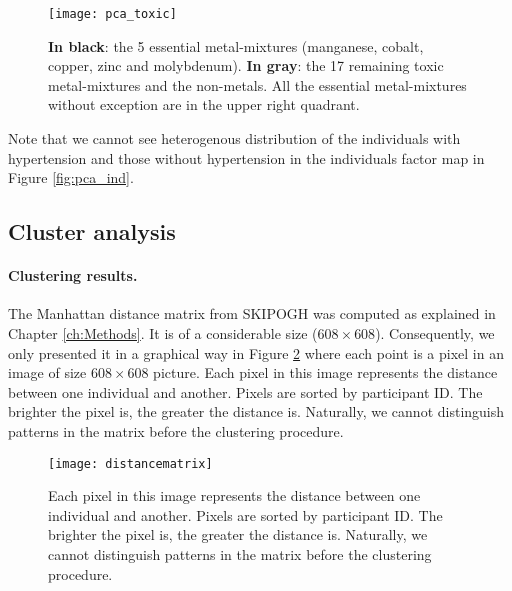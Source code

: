 \begin{figure}
\centering
\captionsetup{singlelinecheck = false, format= hang, justification=raggedright, font=small, labelsep=space}
\texttt{[image: pca\_toxic]}
  \label{fig:pca_toxic}
\begin{flushleft}
{\footnotesize \textbf{In black}: the 5 essential metal-mixtures (manganese, cobalt, copper, zinc and molybdenum). \textbf{In gray}: the 17 remaining toxic metal-mixtures and the non-metals. All the essential metal-mixtures without exception are in the upper right quadrant.}
\end{flushleft}
\end{figure}

Note that we cannot see heterogenous distribution of the individuals with hypertension and those without hypertension in the individuals factor map in Figure \ref{fig:pca_ind}.

\subsection{Cluster analysis}

\paragraph{Clustering results.}
The Manhattan distance matrix from SKIPOGH was computed as explained in Chapter \ref{ch:Methods}. It is of a considerable size ($608 \times 608$). Consequently, we only presented it in a graphical way in Figure \ref{fig:distancematrix} where each point is a pixel in an image of size $608 \times 608$ picture. Each pixel in this image represents the distance between one individual and another. Pixels are sorted by participant ID. The brighter the pixel is, the greater the distance is. Naturally, we cannot distinguish patterns in the matrix before the clustering procedure. 

\begin{figure}
\centering
\captionsetup{singlelinecheck = false, format= hang, justification=raggedright, font=small, labelsep=space}
\texttt{[image: distancematrix]}
  \label{fig:distancematrix}
\begin{flushleft}
{\footnotesize Each pixel in this image represents the distance between one individual and another. Pixels are sorted by participant ID. The brighter the pixel is, the greater the distance is. Naturally, we cannot distinguish patterns in the matrix before the clustering procedure. }
\end{flushleft}
\end{figure}

